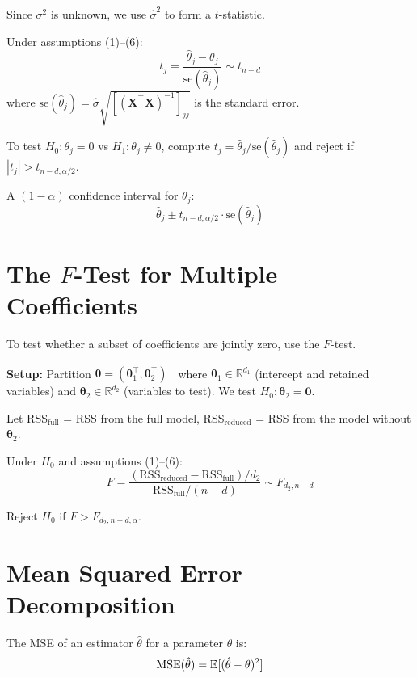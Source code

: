 \documentclass[main.tex]{subfiles}
\begin{document}
Since $\sigma^2$ is unknown, we use $\hat{\sigma}^2$ to form a $t$-statistic.

\begin{theorem}
Under assumptions (1)--(6):
$$t_j = \frac{\hat{\theta}_j - \theta_j}{\text{se}(\hat{\theta}_j)} \sim t_{n-d}$$
where $\text{se}(\hat{\theta}_j) = \hat{\sigma}\sqrt{[(\mathbf{X}^\top\mathbf{X})^{-1}]_{jj}}$ is the standard error.
\end{theorem}

To test $H_0: \theta_j = 0$ vs $H_1: \theta_j \neq 0$, compute $t_j = \hat{\theta}_j / \text{se}(\hat{\theta}_j)$ and reject if $|t_j| > t_{n-d, \alpha/2}$.

A $(1-\alpha)$ confidence interval for $\theta_j$:
$$\hat{\theta}_j \pm t_{n-d, \alpha/2} \cdot \text{se}(\hat{\theta}_j)$$

\needspace{0.33\textheight}
\section{The $F$-Test for Multiple Coefficients}

To test whether a subset of coefficients are jointly zero, use the $F$-test.

\textbf{Setup:} Partition $\boldsymbol{\theta} = (\boldsymbol{\theta}_1^\top, \boldsymbol{\theta}_2^\top)^\top$ where $\boldsymbol{\theta}_1 \in \mathbb{R}^{d_1}$ (intercept and retained variables) and $\boldsymbol{\theta}_2 \in \mathbb{R}^{d_2}$ (variables to test). We test $H_0: \boldsymbol{\theta}_2 = \mathbf{0}$.

Let $\text{RSS}_{\text{full}}$ = RSS from the full model, $\text{RSS}_{\text{reduced}}$ = RSS from the model without $\boldsymbol{\theta}_2$.

\begin{theorem}
Under $H_0$ and assumptions (1)--(6):
$$F = \frac{(\text{RSS}_{\text{reduced}} - \text{RSS}_{\text{full}})/d_2}{\text{RSS}_{\text{full}}/(n-d)} \sim F_{d_2, n-d}$$
\end{theorem}

Reject $H_0$ if $F > F_{d_2, n-d, \alpha}$.

\needspace{0.33\textheight}
\section{Mean Squared Error Decomposition}

The MSE of an estimator $\hat{\theta}$ for a parameter $\theta$ is:
$$\text{MSE}(\hat{\theta}) = \mathbb{E}[(\hat{\theta} - \theta)^2]$$
\end{document}
